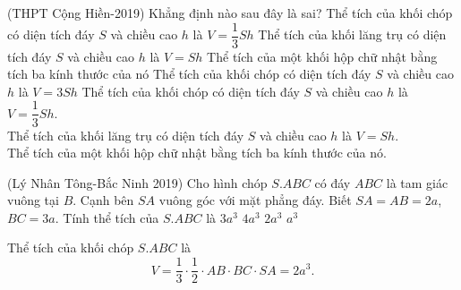 \begin{ex}%
	(THPT Cộng Hiền-2019) Khẳng định nào sau đây là sai?
	\choice
	{Thể tích của khối chóp có diện tích đáy $S$ và chiều cao $h$ là $ V=\dfrac{1}{3}Sh$}
	{Thể tích của khối lăng trụ có diện tích đáy $S$ và chiều cao $h$ là $ V=Sh$}
	{Thể tích của một khối hộp chữ nhật bằng tích ba kính thước của nó}
	{\True Thể tích của khối chóp có diện tích đáy $S$ và chiều cao $ h$ là $ V=3Sh$}
	\loigiai
	{
		Thể tích của khối chóp có diện tích đáy $S$ và chiều cao $h$ là $ V=\dfrac{1}{3}Sh.$\\
		Thể tích của khối lăng trụ có diện tích đáy $S$ và chiều cao $h$ là $ V=Sh.$\\
		Thể tích của một khối hộp chữ nhật bằng tích ba kính thước của nó.
	}
	
\end{ex}
%
\begin{ex}%
	(Lý Nhân Tông-Bắc Ninh 2019) Cho hình chóp $ S.ABC$ có đáy $ ABC$ là tam giác vuông tại $ B.$ Cạnh bên $SA$ vuông góc với mặt phẳng đáy. Biết $ SA=AB=2a$, $ BC=3a$. Tính thể tích của $ S.ABC$ là
	\choice
	{$3a^3$}
	{$4a^3$}
	{\True $2a^3$}
	{$a^3$}
	\loigiai
	{
		\begin{center}
		\end{center}
		Thể tích của khối chóp $S.ABC$ là $$V=\dfrac{1}{3}\cdot \dfrac{1}{2}\cdot AB\cdot BC\cdot SA=2a^3.$$}
\end{ex}
%
